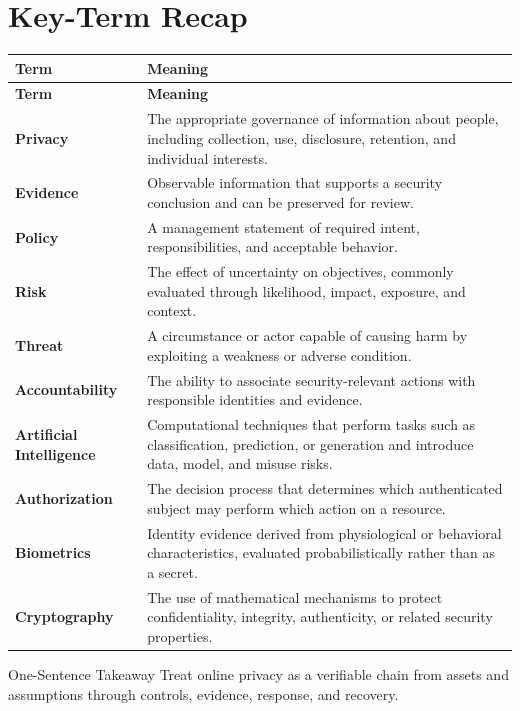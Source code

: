 \documentclass[11pt,letterpaper]{article}
\begin{document}
\section*{Key-Term Recap}
\begin{longtable}{>{\raggedright\arraybackslash}p{}>{\raggedright\arraybackslash}p{}}
\toprule\rowcolor{Navy}\color{white}\textbf{Term} & \color{white}\textbf{Meaning}\\\midrule
\endfirsthead
\toprule\rowcolor{Navy}\color{white}\textbf{Term} & \color{white}\textbf{Meaning}\\\midrule
\endhead
\textbf{Privacy} & The appropriate governance of information about people, including collection, use, disclosure, retention, and individual interests. \\\midrule
\textbf{Evidence} & Observable information that supports a security conclusion and can be preserved for review. \\\midrule
\textbf{Policy} & A management statement of required intent, responsibilities, and acceptable behavior. \\\midrule
\textbf{Risk} & The effect of uncertainty on objectives, commonly evaluated through likelihood, impact, exposure, and context. \\\midrule
\textbf{Threat} & A circumstance or actor capable of causing harm by exploiting a weakness or adverse condition. \\\midrule
\textbf{Accountability} & The ability to associate security-relevant actions with responsible identities and evidence. \\\midrule
\textbf{Artificial Intelligence} & Computational techniques that perform tasks such as classification, prediction, or generation and introduce data, model, and misuse risks. \\\midrule
\textbf{Authorization} & The decision process that determines which authenticated subject may perform which action on a resource. \\\midrule
\textbf{Biometrics} & Identity evidence derived from physiological or behavioral characteristics, evaluated probabilistically rather than as a secret. \\\midrule
\textbf{Cryptography} & The use of mathematical mechanisms to protect confidentiality, integrity, authenticity, or related security properties. \\\midrule
\bottomrule
\end{longtable}
\begin{CornellExamBox}{One-Sentence Takeaway}
Treat online privacy as a verifiable chain from assets and assumptions through controls, evidence, response, and recovery.
\end{CornellExamBox}
\end{document}
